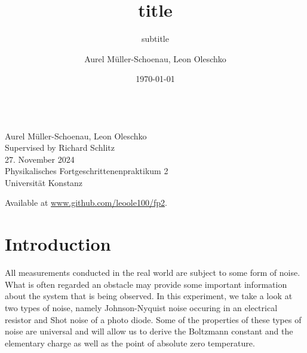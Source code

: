 \documentclass[
    parskip=half, 
    twoside=false,
    twocolumn=true,
    fontsize=11pt,
]{scrarticle}
\begin{document}
\title{title}
\subtitle{subtitle}
\author{Aurel Müller-Schoenau, Leon Oleschko}
\date{\dotdate\today}


\begin{titlepage}
    \sffamily
    \vspace*{3cm}
    {
        \fontsize{32}{32}
    }
    \vspace{.25cm}\\
    {
        \Large
        Aurel Müller-Schoenau, Leon Oleschko\\
        Supervised by Richard Schlitz
        \vspace{.05cm}\\
        27. November 2024
        \vspace{.25cm}\\
        \normalsize
        Physikalisches Fortgeschrittenenpraktikum 2\\
        Universität Konstanz
    }
    \vfill
    {
        \normalfont\normalsize
        
    }
    \vfill
    \begin{flushright}
        Available at \url{www.github.com/leoole100/fp2}.
    \end{flushright}
\end{titlepage}

\section{Introduction}

All measurements conducted in the real world are subject to some form of noise. What is often regarded an obstacle may provide some important information about the system that is being observed. In this experiment, we take a look at two types of noise, namely Johnson-Nyquist noise occuring in an electrical resistor and Shot noise of a photo diode. Some of the properties of these types of noise are universal and will allow us to derive the Boltzmann constant and the elementary charge as well as the point of absolute zero temperature.
\end{document}
